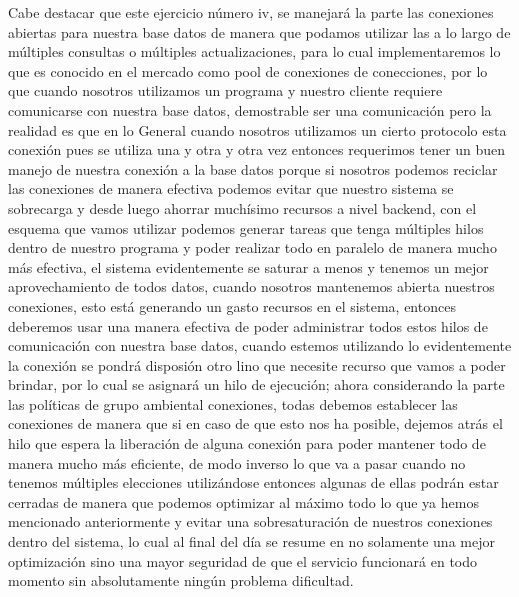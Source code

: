 \documentclass[10pt,a4paper]{article}
\begin{document}
Cabe destacar que este ejercicio número iv, se manejará la parte las conexiones abiertas para nuestra base datos de manera que podamos utilizar las a lo largo de múltiples consultas o múltiples actualizaciones, para lo cual implementaremos lo que es conocido en el mercado como pool de conexiones de conecciones, por lo que cuando nosotros utilizamos un programa y nuestro cliente requiere comunicarse con nuestra base datos, demostrable ser una comunicación pero la realidad es que en lo General cuando nosotros utilizamos un cierto protocolo esta conexión pues se utiliza una y otra y otra vez entonces requerimos tener un buen manejo de nuestra conexión a la base datos porque si nosotros podemos reciclar las conexiones de manera efectiva podemos evitar que nuestro sistema se sobrecarga y desde luego ahorrar muchísimo recursos a nivel backend, con el esquema que vamos utilizar podemos generar tareas que tenga múltiples hilos dentro de nuestro programa y poder realizar todo en paralelo de manera mucho más efectiva, el sistema evidentemente se saturar a menos y tenemos un mejor aprovechamiento de todos datos, cuando nosotros mantenemos abierta nuestros conexiones, esto está generando un gasto recursos en el sistema, entonces deberemos usar una manera efectiva de poder administrar todos estos hilos de comunicación con nuestra base datos, cuando estemos utilizando lo evidentemente la conexión se pondrá disposión otro lino que necesite recurso que vamos a poder brindar, por lo cual se asignará un hilo de ejecución; ahora considerando la parte las políticas de grupo ambiental conexiones, todas debemos establecer las conexiones de manera que si en caso de que esto nos ha posible, dejemos atrás el hilo que espera la liberación de alguna conexión para poder mantener todo de manera mucho más eficiente, de modo inverso lo que va a pasar cuando no tenemos múltiples elecciones utilizándose entonces algunas de ellas podrán estar cerradas de manera que podemos optimizar al máximo todo lo que ya hemos mencionado anteriormente y evitar una sobresaturación de nuestros conexiones dentro del sistema, lo cual al final del día se resume en no solamente una mejor optimización sino una mayor seguridad de que el servicio funcionará en todo momento sin absolutamente ningún problema dificultad.



\pagebreak

\section{\color{colorIPN}{Conceptos (generalidades)}}
\end{document}

